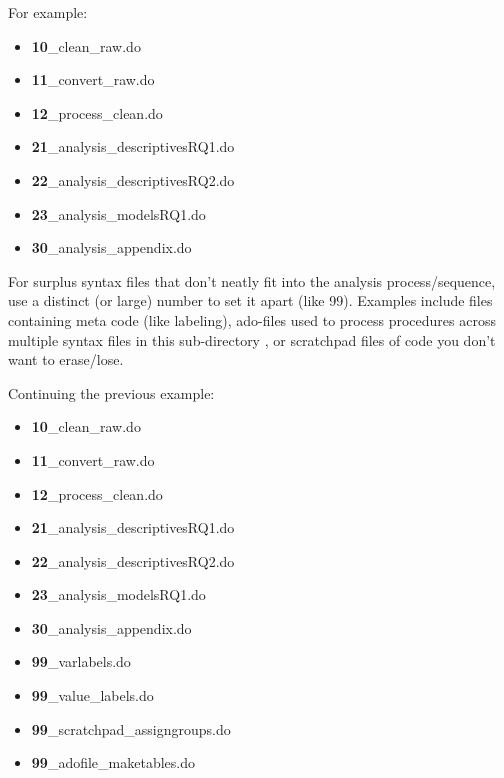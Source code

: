For example:
\linespread{1}
\begin{itemize}[label=]
	\item   \textbf{10}\_clean\_raw.do
	\item   \textbf{11}\_convert\_raw.do
	\item   \textbf{12}\_process\_clean.do
	\item   \textbf{21}\_analysis\_descriptivesRQ1.do
	\item   \textbf{22}\_analysis\_descriptivesRQ2.do
	\item   \textbf{23}\_analysis\_modelsRQ1.do
	\item   \textbf{30}\_analysis\_appendix.do
\end{itemize}
\linespread{1.25}

For surplus syntax files that don't neatly fit into the analysis process/sequence, use a distinct (or large) number to set it apart (like 99).  Examples include files containing meta code (like labeling), ado-files used to process procedures across multiple syntax files in this sub-directory , or scratchpad files of code you don't want to erase/lose.

Continuing the previous example:

\linespread{1}

\begin{itemize}[label=]
	\item   {\textcolor{gray!95!}{\textbf{10}\_clean\_raw.do}}
	\item    {\textcolor{gray!95!}{\textbf{11}\_convert\_raw.do}}
	\item    {\textcolor{gray!95!}{\textbf{12}\_process\_clean.do}}
	\item    {\textcolor{gray!95!}{\textbf{21}\_analysis\_descriptivesRQ1.do}}
	\item   {\textcolor{gray!95!}{\textbf{22}\_analysis\_descriptivesRQ2.do}}
	\item    {\textcolor{gray!95!}{\textbf{23}\_analysis\_modelsRQ1.do}}
	\item    {\textcolor{gray!95!}{\textbf{30}\_analysis\_appendix.do}}
	\item    {\textcolor{uscred}{\textbf{99}\_varlabels.do}}
	\item    {\textcolor{uscred}{\textbf{99}\_value\_labels.do}}
	\item    {\textcolor{uscred}{\textbf{99}\_scratchpad\_assigngroups.do}}
	\item    {\textcolor{uscred}{\textbf{99}\_adofile\_maketables.do}}
\end{itemize}
\linespread{1.25}

